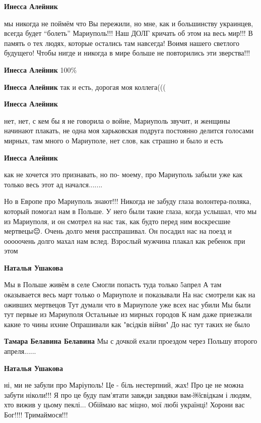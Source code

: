 \begin{itemize} %
\textbf{Инесса Алейник} 

мы никогда не поймём что Вы пережили, но мне, как и большинству украинцев,
всегда будет \enquote{болеть} Мариуполь!!! Наш ДОЛГ кричать об этом на весь мир!!! В
память о тех людях, которые остались там навсегда! Воимя нашего светлого
будущего! Чтобы нигде и никогда в мире больше не повторились эти зверства!!!

\textbf{Инесса Алейник} 100\%

\textbf{Инесса Алейник} так и есть, дорогая моя коллега(((

\textbf{Инесса Алейник} 

нет, нет, с кем бы я не говорила о войне, Мариуполь звучит, и женщины начинают
плакать, не одна моя харьковская подруга постоянно делится голосами мирных, там
много о Мариуполе, нет слов, как страшно и было и есть

\textbf{Инесса Алейник} 

как не хочется это признавать, но по- моему, про Мариуполь забыли уже как
только весь этот ад начался.......

Но в Европе про Мариуполь знают!!! Никогда не забуду глаза волонтера-поляка,
который помогал нам в Польше. У него были такие глаза, когда услышал, что мы из
Мариуполя, и он смотрел на нас так, как будто перед ним воскресшие мертвецы😔.
Очень долго меня расспрашивал. Он посадил нас на поезд и ооооочень долго махал
нам вслед. Взрослый мужчина плакал как ребенок при этом🤗

\textbf{Наталья Ушакова} 

Мы в Польше живём в селе Смогли попасть туда только 5апрел А там оказывается
весь март только о Мариуполе и показывали На нас смотрели как на оживших
мертвецов Тут думали что в Мариуполе уже всех нас убили Мы были тут первые из
Мариуполя Остальные из мирных городов К нам даже приезжали какие то чины ихние
Опрашивали как "всідків війни" До нас тут таких не было

\textbf{Тамара Белавина Белавина} Мы с дочкой ехали проездом через Польшу второго апреля......

\textbf{Наталья Ушакова} 

ні, ми не забули про Маріуполь! Це - біль нестерпний, жах! Про це не можна
забути ніколи!!! Я про це буду пам'ятати завжди завдяки вам-￼свідкам і людям,
хто вижив у цьому пеклі... Обіймаю вас міцно, мої любі українці! Хорони вас
Бог!!!! Тримаймося!!!

\end{itemize} %

